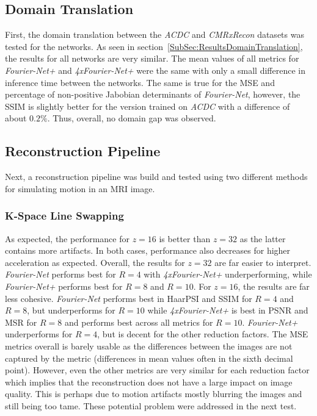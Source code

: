 \subsection{Domain Translation} \label{SubSec:DiscussionDomainTranslation}
First, the domain translation between the \emph{ACDC} and \emph{CMRxRecon} datasets was tested for the networks. As seen in section~\ref{SubSec:ResultsDomainTranslation}, the results for all networks are very similar. The mean values of all metrics for \emph{Fourier-Net+} and \emph{4xFourier-Net+} were the same with only a small difference in inference time between the networks. The same is true for the MSE and percentage of non-positive Jabobian determinants of \emph{Fourier-Net}, however, the SSIM is slightly better for the version trained on \emph{ACDC} with a difference of about $0.2 \%$. Thus, overall, no domain gap was observed.

\subsection{Reconstruction Pipeline} \label{SubSec:DiscussionReconstructionPipeline}
Next, a reconstruction pipeline was build and tested using two different methods for simulating motion in an MRI image.

\subsubsection{K-Space Line Swapping}
As expected, the performance for $z=16$ is better than $z=32$ as the latter contains more artifacts. In both cases, performance also decreases for higher acceleration as expected. Overall, the results for $z=32$ are far easier to interpret. \emph{Fourier-Net} performs best for $R=4$ with \emph{4xFourier-Net+} underperforming, while \emph{Fourier-Net+} performs best for $R=8$ and $R=10$. For $z=16$, the results are far less cohesive. \emph{Fourier-Net} performs best in HaarPSI and SSIM for $R=4$ and $R=8$, but underperforms for $R=10$ while \emph{4xFourier-Net+} is best in PSNR and MSR for $R=8$ and performs best across all metrics for $R=10$. \emph{Fourier-Net+} underperforms for $R=4$, but is decent for the other reduction factors. The MSE metrics overall is barely usable as the differences between the images are not captured by the metric (differences in mean values often in the sixth decimal point). However, even the other metrics are very similar for each reduction factor which implies that the reconstruction does not have a large impact on image quality. This is perhaps due to motion artifacts mostly blurring the images and still being too tame. These potential problem were addressed in the next test.


